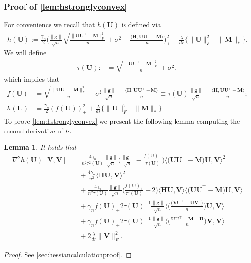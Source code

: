 \documentclass[10pt]{article}
\renewcommand{\t}{^{\top}}
\newcommand{\inv}{^{-1}}
\newtheorem{lemma}{Lemma}
\theoremstyle{definition}
\begin{document}
\subsubsection{Proof of \cref{lem:hstronglyconvex}} \label{sec:hstronglyconvexproof}
For convenience we recall that $h(\bm{U})$ is defined via
\begin{align}
    h(\bm{U}) := \frac{\gamma_n}{2} \bigg( \frac{\|\bm{g}\|}{\sqrt{n}} \sqrt{\frac{\|\bm{UU}\t - \bm{M} \|_F^2}{n} + \sigma^2} - \frac{\langle \bm{H},\bm{UU}\t - \bm{M} \rangle}{n} \bigg)_+^2 + \frac{\lambda}{dr} \big\{ \| \bm{U} \|_F^2 - \|\bm{M}\|_* \big\}.
\end{align}
We will define
\begin{align}
    \tau(\bm{U}) :&= \sqrt{\frac{\|\bm{UU}\t - \bm{M}\|_F^2}{n} + \sigma^2},
\end{align}
which implies that
\begin{align}
    f(\bm{U}) &= \sqrt{\frac{\|\bm{UU}\t - \bm{M}\|_F^2}{n} + \sigma^2} \frac{\|\bm{g}\|}{\sqrt{n}} - \frac{\langle \bm{H}, \bm{UU}\t - \bm{M} \rangle}{n} \equiv \tau(\bm{U}) \frac{\|\bm{g}\|}{\sqrt{n}} - \frac{\langle \bm{H}, \bm{UU}\t - \bm{M} \rangle}{n}; \\
    h(\bm{U}) &= \frac{\gamma_n}{2} ( f(\bm{U}))_+^2 + \frac{\lambda}{dr} \big\{ \|\bm{U}\|_F^2 - \|\bm{M}\|_* \big\}.
\end{align}
To prove \cref{lem:hstronglyconvex} we present the following lemma computing the second derivative of $h$.
\begin{lemma} \label{lem:hessiancalculation}
It holds that
\begin{align}
    \nabla^2 h(\bm{U})[ \bm{V}, \bm{V}] &=  \frac{4 \gamma_n}{n^2 \tau^2(\bm{U})} \frac{\|\bm{g}\|}{\sqrt{n}} \bigg( \frac{\|\bm{g}\|}{\sqrt{n}} - \frac{f(\bm{U})_+}{\tau(\bm{U})} \bigg) \bigg \langle \big( \bm{UU}\t - \bm{M}\big) \bm{U}, \bm{V} \bigg \rangle^2 \\
    &\quad + \frac{4\gamma_n}{n^2} \bigg \langle \bm{HU}, \bm{V} \bigg\rangle^2 \\
    &\quad + \frac{4 \gamma_n}{n^2 \tau(\bm{U})} \frac{\|\bm{g}\|}{\sqrt{n}} \bigg( \frac{f(\bm{U})_+}{\tau^2(\bm{U})} - 2 \bigg) \bigg \langle \bm{HU}, \bm{V} \bigg \rangle \bigg \langle \big( \bm{UU}\t - \bm{M} \big) \bm{U}, \bm{V} \bigg \rangle \\
    &\quad +\gamma_n f(\bm{U})_+ 2\tau(\bm{U})\inv \frac{\|\bm{g}\|}{\sqrt{n}}  \bigg\langle \bigg(  \frac{\big(  \bm{VU}\t +  \bm{UV}\t \big) }{n}  \bigg)\bm{U}, \bm{V} \bigg \rangle \\
    &\quad +\gamma_n f(\bm{U})_+ 2\tau(\bm{U})\inv \frac{\|\bm{g}\|}{\sqrt{n}}  \bigg\langle \bigg(  \frac{\bm{UU}\t - \bm{M}- \bm{H}}{n}  \bigg) \bm{V} , \bm{V} \bigg \rangle \\
    &\quad + 2 \frac{\lambda}{dr} \| \bm{V} \|_F^2.
\end{align}
\end{lemma}
\begin{proof}
    See \cref{sec:hessiancalculationproof}.
\end{proof}
\end{document}
